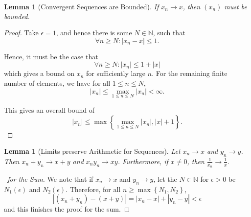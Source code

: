 \documentclass[11pt]{article}
\numberwithin{equation}{section}
\newtheorem{lemma}[theorem]{Lemma}
\theoremstyle{definition}
\theoremstyle{remark}
\newcommand{\pqty}[1]{\left(#1\right)}
\newcommand{\Bqty}[1]{\left\{#1\right\}}
\newcommand{\abs}[1]{\left|#1\right|}
\newcommand{\NN}{\mathbb N}
\begin{document}
\begin{lemma}[Convergent Sequences are Bounded]\label{analysis-unit-0012}
    \label{lem:seq-convergence-bounded}%
    If \(x_n \to x\), then \(\pqty{x_n}\) must be bounded.
\end{lemma}

\begin{proof}
    Take \(\epsilon = 1\), and hence there is some \(N \in \NN\), such that
    \[
        \forall n \geq N: \abs{x_n - x} \leq 1.
    \]

    Hence, it must be the case that
    \[
        \forall n \geq N: \abs{x_n} \leq 1 + \abs{x}
    \]
    which gives a bound on \(x_n\) for sufficiently large \(n\). For the remaining finite number of elements, we have for all \(1 \leq n \leq N\),
    \[
        \abs{x_n} \leq \max_{1 \leq n \leq N} \abs{x_n} < \infty.
    \]

    This gives an overall bound of
    \[
        \abs{x_n} \leq \max\Bqty{\max_{1 \leq n \leq N} \abs{x_n}, \abs{x} + 1}.
    \]
\end{proof}

\begin{lemma}[Limits preserve Arithmetic for Sequences]\label{analysis-unit-0013}
    \label{lem:seq-limits-arithmetic}%
    Let \(x_n \to x\) and \(y_n \to y\). Then \(x_n + y_n \to x + y\) and \(x_n y_n \to xy\). Furthermore, if \(x \neq 0\), then \(\frac{1}{x_n} \to \frac{1}{x}\).
\end{lemma}

\begin{proof}[\proofname\ for the Sum]
    We note that if \(x_n \to x\) and \(y_n \to y\), let the \(N \in \NN\) for \(\epsilon > 0\) be \(N_1\pqty{\epsilon}\) and \(N_2\pqty{\epsilon}\). Therefore, for all \(n \geq \max\Bqty{N_1, N_2}\),
    \[
        \abs{\pqty{x_n + y_n} - \pqty{x + y}} = \abs{x_n - x} + \abs{y_n - y} < \epsilon
    \]
    and this finishes the proof for the sum.
\end{proof}
\end{document}
